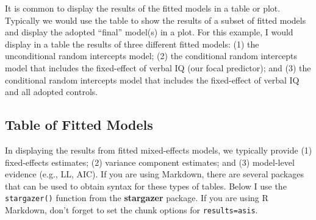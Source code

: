 \documentclass[]{book}
\begin{document}
It is common to display the results of the fitted models in a table or plot. Typically we would use the table to show the results of a subset of fitted models and display the adopted ``final'' model(s) in a plot. For this example, I would display in a table the results of three different fitted models: (1) the unconditional random intercepts model; (2) the conditional random intercepts model that includes the fixed-effect of verbal IQ (our focal predictor); and (3) the conditional random intercepts model that includes the fixed-effect of verbal IQ and all adopted controls.

\hypertarget{table-of-fitted-models}{%
\subsection{Table of Fitted Models}\label{table-of-fitted-models}}

In displaying the results from fitted mixed-effects models, we typically provide (1) fixed-effects estimates; (2) variance component estimates; and (3) model-level evidence (e.g., LL, AIC). If you are using Markdown, there are several packages that can be used to obtain syntax for these types of tables. Below I use the \texttt{stargazer()} function from the \textbf{stargazer} package. If you are using R Markdown, don't forget to set the chunk options for \texttt{results=\textquotesingle{}asis\textquotesingle{}}.
\end{document}
